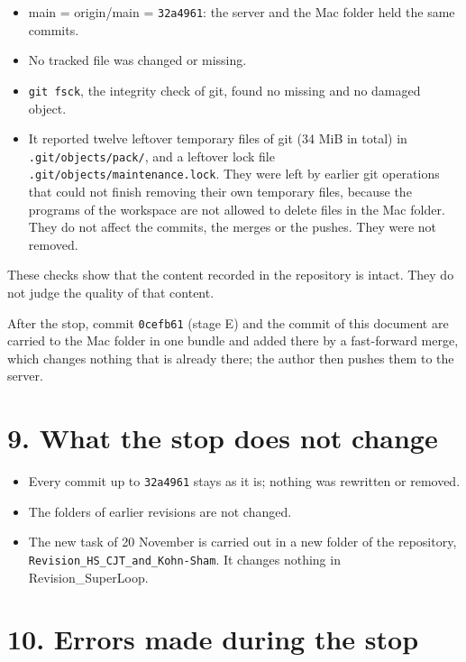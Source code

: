 \documentclass[
  10pt,
]{article}
\providecommand{\tightlist}{%
  \setlength{\itemsep}{0pt}\setlength{\parskip}{0pt}}
\begin{document}
\begin{itemize}
\tightlist
\item
  main = origin/main = \texttt{32a4961}: the server and the Mac folder
  held the same commits.
\item
  No tracked file was changed or missing.
\item
  \texttt{git\ fsck}, the integrity check of git, found no missing and
  no damaged object.
\item
  It reported twelve leftover temporary files of git (34 MiB in total)
  in \texttt{.git/objects/pack/}, and a leftover lock file
  \texttt{.git/objects/maintenance.lock}. They were left by earlier git
  operations that could not finish removing their own temporary files,
  because the programs of the workspace are not allowed to delete files
  in the Mac folder. They do not affect the commits, the merges or the
  pushes. They were not removed.
\end{itemize}

These checks show that the content recorded in the repository is intact.
They do not judge the quality of that content.

After the stop, commit \texttt{0cefb61} (stage E) and the commit of this
document are carried to the Mac folder in one bundle and added there by
a fast-forward merge, which changes nothing that is already there; the
author then pushes them to the server.

\hypertarget{what-the-stop-does-not-change}{%
\section{9. What the stop does not
change}\label{what-the-stop-does-not-change}}

\begin{itemize}
\tightlist
\item
  Every commit up to \texttt{32a4961} stays as it is; nothing was
  rewritten or removed.
\item
  The folders of earlier revisions are not changed.
\item
  The new task of 20 November is carried out in a new folder of the
  repository, \texttt{Revision\_HS\_CJT\_and\_Kohn-Sham}. It changes
  nothing in Revision\_SuperLoop.
\end{itemize}

\hypertarget{errors-made-during-the-stop}{%
\section{10. Errors made during the
stop}\label{errors-made-during-the-stop}}
\end{document}
